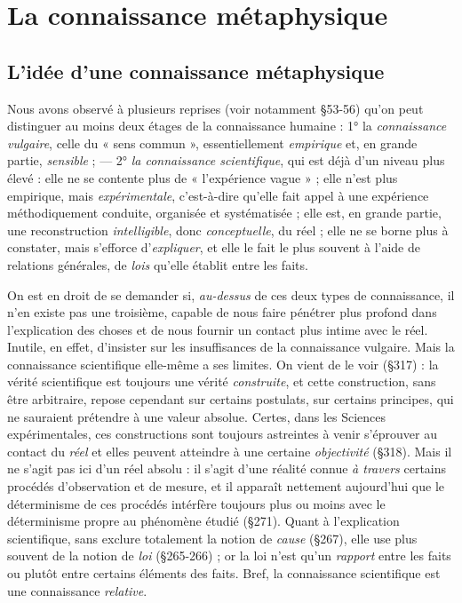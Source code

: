 \chapter{La connaissance métaphysique}

\section{L'idée d’une connaissance métaphysique}%
Nous avons observé à plusieurs reprises (voir notamment \S 53-56) qu’on peut
distinguer au moins deux étages de la connaissance humaine : 1° la
{\it connaissance vulgaire}, celle du « sens commun », essentiellement
{\it empirique} et, en grande partie, {\it sensible} ; — 2° {\it la connaissance scientifique},
qui est déjà d’un niveau plus élevé : elle ne se contente plus de
« l’expérience vague » ; elle n’est plus empirique, mais {\it expérimentale},
c’est-à-dire qu’elle fait appel à une expérience méthodiquement
conduite, organisée et systématisée ; elle est, en grande partie, une
reconstruction {\it intelligible}, donc {\it conceptuelle}, du réel ; elle ne se borne
plus à constater, mais s’efforce d'{\it expliquer}, et elle le fait le plus souvent
à l’aide de relations générales, de {\it lois} qu’elle établit entre les faits.

On est en droit de se demander si, {\it au-dessus} de ces deux types de
connaissance, il n’en existe pas une troisième, capable de nous faire
pénétrer plus profond dans l’explication des choses et de nous fournir
un contact plus intime avec le réel. Inutile, en effet, d’insister sur les
insuffisances de la connaissance vulgaire. Mais la connaissance scientifique
elle-même a ses limites. On vient de le voir (\S 317) : la vérité
scientifique est toujours une vérité {\it construite}, et cette construction,
sans être arbitraire, repose cependant sur certains postulats, sur certains
principes, qui ne sauraient prétendre à une valeur absolue. Certes,
dans les Sciences expérimentales, ces constructions sont toujours
astreintes à venir s’éprouver au contact du {\it réel} et elles peuvent
atteindre à une certaine {\it objectivité} (\S 318). Mais il ne s'agit pas ici d’un
réel absolu : il s’agit d’une réalité connue {\it à travers} certains procédés
d'observation et de mesure, et il apparaît nettement aujourd’hui que le
déterminisme de ces procédés intérfère toujours plus ou moins avec
le déterminisme propre au phénomène étudié (\S 271). Quant à l’explication
scientifique, sans exclure totalement la notion de {\it cause} (\S 267),
elle use plus souvent de la notion de {\it loi} (\S 265-266) ; or la loi n’est qu'un
{\it rapport} entre les faits ou plutôt entre certains éléments des faits. Bref,
la connaissance scientifique est une connaissance {\it relative}.

